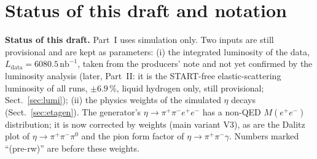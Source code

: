 \documentclass[11pt,a4paper]{article}
\newcommand{\piz}{\ensuremath{\pi^{0}}\xspace}
\newcommand{\pipi}{\ensuremath{\pi^{+}\pi^{-}}\xspace}
\newcommand{\ppee}{\ensuremath{\pi^{+}\pi^{-}e^{+}e^{-}}\xspace}
\newcommand{\Mee}{\ensuremath{M(e^{+}e^{-})}\xspace}
\newcommand{\nbinv}{\ensuremath{\mathrm{nb}^{-1}}\xspace}
\newcommand{\Ldata}{\ensuremath{L_{\mathrm{data}}}\xspace}
\newcommand{\notebox}[1]{\par\noindent\colorbox{orange!10}{\parbox{\dimexpr\linewidth-2\fboxsep\relax}{#1}}\par}
\begin{document}
\appendix
\section{Status of this draft and notation}
\label{sec:appnotation}

\notebox{\textbf{Status of this draft.}
Part~I uses simulation only. Two inputs are still provisional and are kept as parameters:
(i) the integrated luminosity of the data, $\Ldata = 6080.5\,\nbinv$, taken from the
producers' note and not yet confirmed by the luminosity analysis (later, Part~II: it is the START-free elastic-scattering
luminosity of all runs, $\pm6.9$\,\%, liquid hydrogen only, still provisional; Sect.~\ref{sec:lumi});
(ii) the physics weights of the simulated $\eta$ decays (Sect.~\ref{sec:etagen}). The
generator's $\eta\to\ppee$ has a non-QED $\Mee$ distribution; it is now corrected by weights
(main variant V3), as are the Dalitz plot of $\eta\to\pipi\piz$ and the pion form factor of
$\eta\to\pipi\gamma$. Numbers marked ``(pre-rw)'' are before these weights.}
\end{document}
